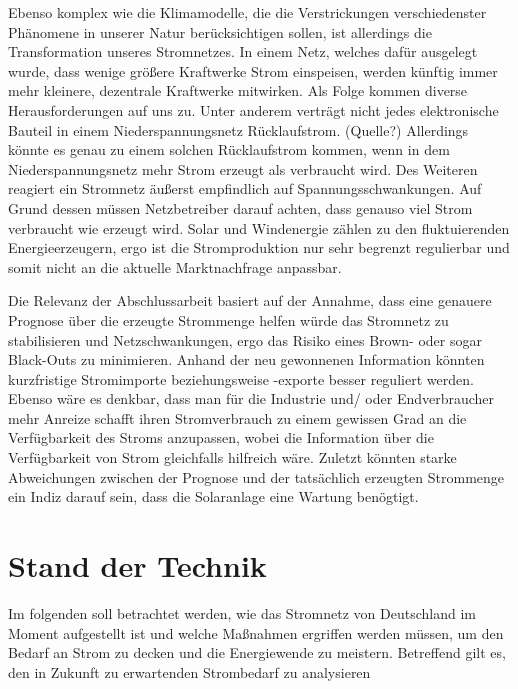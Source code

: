 \documentclass[12pt, a4paper]{article}
\begin{document}
Ebenso komplex wie die Klimamodelle, die die Verstrickungen verschiedenster Phänomene in unserer Natur berücksichtigen sollen, ist allerdings die Transformation unseres Stromnetzes. In einem Netz, welches dafür ausgelegt wurde, dass wenige größere Kraftwerke Strom einspeisen, werden künftig immer mehr kleinere, dezentrale Kraftwerke mitwirken. Als Folge kommen diverse Herausforderungen auf uns zu. Unter anderem verträgt nicht jedes elektronische Bauteil in einem Niederspannungsnetz Rücklaufstrom. (Quelle?) Allerdings könnte es genau zu einem solchen Rücklaufstrom kommen, wenn in dem Niederspannungsnetz mehr Strom erzeugt als verbraucht wird. Des Weiteren reagiert ein Stromnetz äußerst empfindlich auf Spannungsschwankungen. Auf Grund dessen müssen Netzbetreiber darauf achten, dass genauso viel Strom verbraucht wie erzeugt wird. Solar und Windenergie zählen zu den fluktuierenden Energieerzeugern, ergo ist die Stromproduktion nur sehr begrenzt regulierbar und somit nicht an die aktuelle Marktnachfrage anpassbar.

Die Relevanz der Abschlussarbeit basiert auf der Annahme, dass eine genauere Prognose über die erzeugte Strommenge helfen würde das Stromnetz zu stabilisieren und Netzschwankungen, ergo das Risiko eines Brown- oder sogar Black-Outs zu minimieren. Anhand der neu gewonnenen
Information könnten kurzfristige Stromimporte beziehungsweise -exporte besser reguliert werden. Ebenso wäre es denkbar, dass man für die Industrie und/ oder Endverbraucher mehr Anreize schafft ihren Stromverbrauch zu einem gewissen Grad an die Verfügbarkeit des Stroms
anzupassen, wobei die Information über die Verfügbarkeit von Strom gleichfalls hilfreich wäre. Zuletzt könnten starke Abweichungen zwischen der Prognose und der tatsächlich erzeugten Strommenge ein Indiz darauf sein, dass die Solaranlage eine Wartung benögtigt.


\newpage

\section{Stand der Technik}

Im folgenden soll betrachtet werden, wie das Stromnetz von Deutschland im Moment aufgestellt ist und welche Maßnahmen ergriffen werden müssen, um den Bedarf an Strom zu decken und die Energiewende zu meistern. Betreffend gilt es, den in Zukunft zu erwartenden Strombedarf zu analysieren
\end{document}
